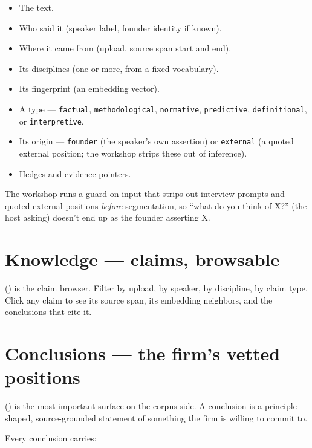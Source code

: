 \documentclass[11pt]{article}
\begin{document}
\begin{itemize}[leftmargin=*,itemsep=0.2em]
  \item The text.
  \item Who said it (speaker label, founder identity if known).
  \item Where it came from (upload, source span start and end).
  \item Its disciplines (one or more, from a fixed vocabulary).
  \item Its fingerprint (an embedding vector).
  \item A type --- \texttt{factual}, \texttt{methodological},
        \texttt{normative}, \texttt{predictive}, \texttt{definitional},
        or \texttt{interpretive}.
  \item Its origin --- \texttt{founder} (the speaker's own assertion)
        or \texttt{external} (a quoted external position; the workshop
        strips these out of inference).
  \item Hedges and evidence pointers.
\end{itemize}

The workshop runs a guard on input that strips out interview prompts
and quoted external positions \emph{before} segmentation, so ``what do
you think of X?'' (the host asking) doesn't end up as the founder
asserting X.

\section{Knowledge --- claims, browsable}

 () is the claim browser. Filter by
upload, by speaker, by discipline, by claim type. Click any claim to
see its source span, its embedding neighbors, and the conclusions that
cite it.

\section{Conclusions --- the firm's vetted positions}

 () is the most important
surface on the corpus side. A conclusion is a principle-shaped,
source-grounded statement of something the firm is willing to commit
to.

Every conclusion carries:
\end{document}
